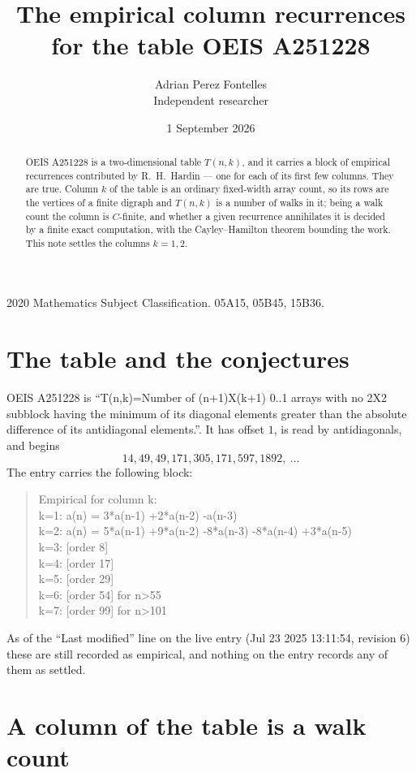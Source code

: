 \documentclass[11pt,a4paper]{article}
\title{The empirical column recurrences for the table OEIS A251228}
\author{Adrian Perez Fontelles\\ \small Independent researcher}
\date{1 September 2026}
\theoremstyle{plain}
\theoremstyle{definition}
\begin{document}
\maketitle

\begin{abstract}
OEIS A251228 is a two-dimensional table $T(n,k)$, and it carries a block of empirical
recurrences contributed by R.~H.~Hardin --- one for each of its first few columns. They are
true. Column $k$ of the table is an ordinary fixed-width array count, so its rows are the
vertices of a finite digraph and $T(n,k)$ is a number of walks in it; being a walk count the
column is $C$-finite, and whether a given recurrence annihilates it is decided by a finite
exact computation, with the Cayley--Hamilton theorem bounding the work. This note settles the columns $k=1, 2$.
\end{abstract}

\noindent\small 2020 Mathematics Subject Classification. 05A15, 05B45, 15B36.\normalsize

\section{The table and the conjectures}

OEIS A251228 is ``T(n,k)=Number of (n+1)X(k+1) 0..1 arrays with no 2X2 subblock having the minimum of its diagonal elements greater than the absolute difference of its antidiagonal elements.''. It has offset $1$, is
read by antidiagonals, and begins
\[
14, 49, 49, 171, 305, 171, 597, 1892,\ \dots
\]
The entry carries the following block:
\begin{quote}\small
Empirical for column k:\\
k=1: a(n) = 3*a(n-1) +2*a(n-2) -a(n-3)\\
k=2: a(n) = 5*a(n-1) +9*a(n-2) -8*a(n-3) -8*a(n-4) +3*a(n-5)\\
k=3: [order 8]\\
k=4: [order 17]\\
k=5: [order 29]\\
k=6: [order 54] for n>55\\
k=7: [order 99] for n>101\\
\end{quote}
As of the ``Last modified'' line on the live entry (Jul 23 2025 13:11:54, revision 6) these are still
recorded as empirical, and nothing on the entry records any of them as settled.

\section{A column of the table is a walk count}
\end{document}
